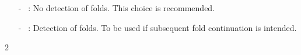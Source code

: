 
\begin{itemize}
\item[-] ~: 
  No detection of folds. This choice is recommended.
\item[-] ~: 
  Detection of folds. To be used if subsequent fold continuation is intended.
\end{itemize}2
 
\subsection{}  \label{sec:ISP}



